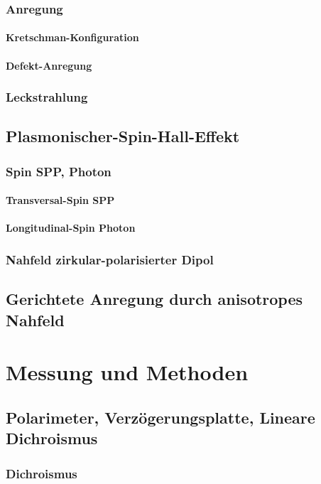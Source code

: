 \documentclass{article}
\begin{document}
		\subsubsection{Anregung}
			\paragraph{Kretschman-Konfiguration}
			\paragraph{Defekt-Anregung}
		\subsubsection{Leckstrahlung}
	\subsection{Plasmonischer-Spin-Hall-Effekt}
	\subsubsection{Spin SPP, Photon}
		\paragraph{Transversal-Spin SPP}
		\paragraph{Longitudinal-Spin Photon}
	\subsubsection{Nahfeld zirkular-polarisierter Dipol}
	\subsection{Gerichtete Anregung durch anisotropes Nahfeld}	
\section{Messung und Methoden}
\subsection{Polarimeter, Verzögerungsplatte, Lineare Dichroismus}
	\subsubsection{Dichroismus}
\end{document}
